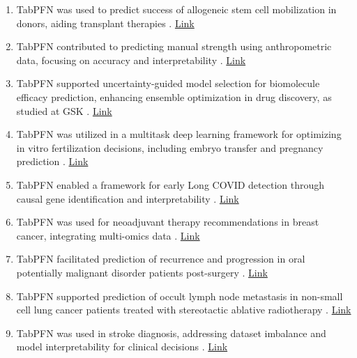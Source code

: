 \begin{enumerate}
\item TabPFN was used to predict success of allogeneic stem cell mobilization in donors, aiding transplant therapies \cite{hc_usecase30_stem_cell_mobilization_tabpfn}. \href{https://www.biorxiv.org/content/10.1101/2025.09.17.676674v1.full}{Link}

\item TabPFN contributed to predicting manual strength using anthropometric data, focusing on accuracy and interpretability \cite{hc_usecase31}. \href{https://pubmed.ncbi.nlm.nih.gov/41021732/}{Link}

\item TabPFN supported uncertainty-guided model selection for biomolecule efficacy prediction, enhancing ensemble optimization in drug discovery, as studied at GSK \cite{hc_usecase32}. \href{https://www.arxiv.org/abs/2510.02476}{Link}

\item TabPFN was utilized in a multitask deep learning framework for optimizing in vitro fertilization decisions, including embryo transfer and pregnancy prediction \cite{hc_usecase33}. \href{https://dspace.mit.edu/handle/1721.1/162969}{Link} 

\item TabPFN enabled a framework for early Long COVID detection through causal gene identification and interpretability \cite{hc_usecase34}. \href{https://www.medrxiv.org/content/10.1101/2025.10.02.25337138v1.full.pdf}{Link}

\item TabPFN was used for neoadjuvant therapy recommendations in breast cancer, integrating multi-omics data \cite{hc_usecase35}. \href{https://www.medrxiv.org/content/10.1101/2025.10.03.25337255v1}{Link} 

\item TabPFN facilitated prediction of recurrence and progression in oral potentially malignant disorder patients post-surgery \cite{hc_usecase36}. \href{https://journals.lww.com/international-journal-of-surgery/abstract/9900/artificial_intelligence_for_predicting.3354.aspx}{Link} 

\item TabPFN supported prediction of occult lymph node metastasis in non-small cell lung cancer patients treated with stereotactic ablative radiotherapy \cite{hc_usecase37}. \href{https://www.redjournal.org/article/S0360-3016(25)05890-0/fulltext}{Link}

\item TabPFN was used in stroke diagnosis, addressing dataset imbalance and model interpretability for clinical decisions \cite{hc_usecase38}. \href{https://www.ijsab.com/jsr-volume-9-issue-1/8205}{Link}


\end{enumerate}
